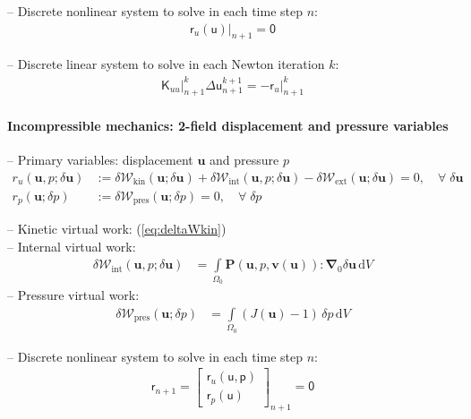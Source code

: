 \documentclass[a4paper,12pt]{report}
\newcommand{\bs}[1]{\boldsymbol{#1}}
\newcommand{\Om}{\mathit{\Omega}}
\newcommand{\ROP}{\bs{\mathsf{r}}}
\begin{document}
-- Discrete nonlinear system to solve in each time step $n$:
\begin{align}
\left.\ROP_{u}(\bs{\mathsf{u}})\right|_{n+1} = \bs{\mathsf{0}}\label{eq:nonlin_sys_solid}
\end{align}

-- Discrete linear system to solve in each Newton iteration $k$:
\begin{align}
\left. \bs{\mathsf{K}}_{uu} \right|_{n+1}^{k} \Delta\bs{\mathsf{u}}_{n+1}^{k+1}=-\left. \ROP_{u} \right|_{n+1}^{k} \label{eq:lin_sys_solid}
\end{align}


\paragraph{Incompressible mechanics: 2-field displacement and pressure variables}
-- Primary variables: displacement $\bs{u}$ and pressure $p$
\begin{align}
r_u(\bs{u},p;\delta\bs{u}) &:= \delta \mathcal{W}_{\mathrm{kin}}(\bs{u};\delta\bs{u}) + \delta \mathcal{W}_{\mathrm{int}}(\bs{u},p;\delta\bs{u}) - \delta \mathcal{W}_{\mathrm{ext}}(\bs{u};\delta\bs{u}) = 0, \quad \forall \; \delta\bs{u} \label{eq:res_u_solid_incomp}\\
r_p(\bs{u};\delta p) &:= \delta \mathcal{W}_{\mathrm{pres}}(\bs{u};\delta p) = 0, \quad \forall \; \delta p
\end{align}

-- Kinetic virtual work: (\ref{eq:deltaWkin})\\
-- Internal virtual work:
\begin{align}
\delta \mathcal{W}_{\mathrm{int}}(\bs{u},p;\delta\bs{u}) &= \int\limits_{\Om_{0}} \bs{P}(\bs{u},p,\bs{v}(\bs{u})) : \bs{\nabla}_{0} \delta\bs{u} \,\mathrm{d}V \label{eq:deltaWint_incomp}
\end{align}
-- Pressure virtual work:
\begin{align}
\delta \mathcal{W}_{\mathrm{pres}}(\bs{u};\delta p) &= \int\limits_{\Om_{0}} (J(\bs{u}) - 1) \,\delta p \,\mathrm{d}V \label{eq:deltaWpres}
\end{align}

-- Discrete nonlinear system to solve in each time step $n$:
\begin{align}
\ROP_{n+1} = \begin{bmatrix} \ROP_{u}(\bs{\mathsf{u}},\bs{\mathsf{p}}) \\ \ROP_{p}(\bs{\mathsf{u}}) \end{bmatrix}_{n+1} = \bs{\mathsf{0}}\label{eq:nonlin_sys_solid_inc}
\end{align}
\end{document}

